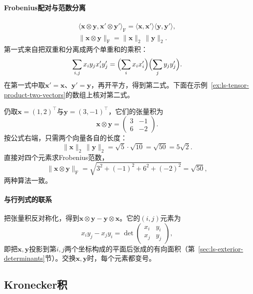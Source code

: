 \paragraph{Frobenius配对与范数分离}
\[
 \begin{gathered}
\langle\bm x\otimes\bm y,\bm x'\otimes\bm y'\rangle_{\mathrm F}
 =\langle\bm x,\bm x'\rangle\langle\bm y,\bm y'\rangle,\\
\lVert\bm x\otimes\bm y\rVert_{\mathrm F}=\lVert\bm x\rVert_2\,\lVert\bm y\rVert_2.
 \end{gathered}
\]
第一式来自把双重和分离成两个单重和的乘积：
\[
 \sum_{i,j}x_iy_jx'_iy'_j=\Bigl(\sum_ix_ix'_i\Bigr)\Bigl(\sum_jy_jy'_j\Bigr).
\]
在第一式中取$\bm x'=\bm x$、$\bm y'=\bm y$，再开平方，得到第二式。下面在示例~\ref{ex:ls-tensor-product-two-vectors}的数组上核对第二式。
\begin{example}[张量积范数的数值核对]
\label{ex:ls-tensor-product-norm-check}
仍取$\bm x=(1,2)^\top$与$\bm y=(3,-1)^\top$，它们的张量积为
\[
 \bm x\otimes\bm y=\begin{pmatrix}3&-1\\6&-2\end{pmatrix}.
\]
按公式右端，只需两个向量各自的长度：
\[
 \lVert\bm x\rVert_2\,\lVert\bm y\rVert_2=\sqrt5\cdot\sqrt{10}=\sqrt{50}=5\sqrt2.
\]
直接对四个元素求Frobenius范数，
\[
 \lVert\bm x\otimes\bm y\rVert_{\mathrm F}=\sqrt{3^2+(-1)^2+6^2+(-2)^2}=\sqrt{50},
\]
两种算法一致。
\end{example}

\paragraph{与行列式的联系}
把张量积反对称化，得到$\bm x\otimes\bm y-\bm y\otimes\bm x$。它的$(i,j)$元素为
\[
 x_iy_j-x_jy_i=\det\begin{pmatrix}x_i&y_i\\x_j&y_j\end{pmatrix},
\]
即把$\bm x,\bm y$投影到第$i,j$两个坐标构成的平面后张成的有向面积（第~\ref{sec:ls-exterior-determinants}节）。交换$\bm x,\bm y$时，每个元素都变号。

\subsection{Kronecker积}

